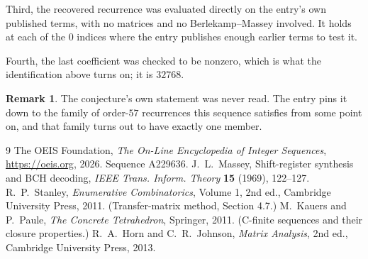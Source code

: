 \documentclass[11pt,a4paper]{article}
\theoremstyle{plain}
\theoremstyle{definition}
\newtheorem{remark}[theorem]{Remark}
\begin{document}
Third, the recovered recurrence was evaluated directly on the entry's own published terms, with
no matrices and no Berlekamp--Massey involved. It holds at each of the $0$ indices where
the entry publishes enough earlier terms to test it.

Fourth, the last coefficient was checked to be nonzero, which is what the identification above
turns on; it is $32768$.

\begin{remark}
The conjecture's own statement was never read. The entry pins it down to the family of
order-$57$ recurrences this sequence satisfies from some point on, and that family turns
out to have exactly one member.
\end{remark}

\begin{thebibliography}{9}
 The OEIS Foundation, \emph{The On-Line Encyclopedia of Integer
Sequences}, \url{https://oeis.org}, 2026. Sequence A229636.
 J.~L.~Massey, Shift-register synthesis and BCH decoding, \emph{IEEE
Trans. Inform. Theory} \textbf{15} (1969), 122--127.
 R.~P.~Stanley, \emph{Enumerative Combinatorics}, Volume 1, 2nd ed.,
Cambridge University Press, 2011. (Transfer-matrix method, Section 4.7.)
 M.~Kauers and P.~Paule, \emph{The Concrete Tetrahedron}, Springer, 2011.
(C-finite sequences and their closure properties.)
 R.~A.~Horn and C.~R.~Johnson, \emph{Matrix Analysis}, 2nd ed., Cambridge
University Press, 2013.
\end{thebibliography}
\end{document}
